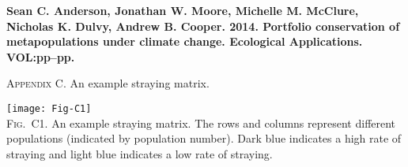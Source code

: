 \documentclass[12pt]{article}
\begin{document}
\textbf{Sean C. Anderson, Jonathan W. Moore, Michelle M. McClure, Nicholas K. Dulvy, Andrew B. Cooper. 2014. Portfolio conservation of metapopulations under climate change. Ecological Applications. VOL:pp--pp.}

\bigskip

\textsc{Appendix C.} An example straying matrix.

\bigskip

\texttt{[image: Fig-C1]}\\
\textsc{Fig.~C1.} An example straying matrix. The rows and columns represent different populations (indicated by population number). Dark blue indicates a high rate of straying and light blue indicates a low rate of straying.
\end{document}
